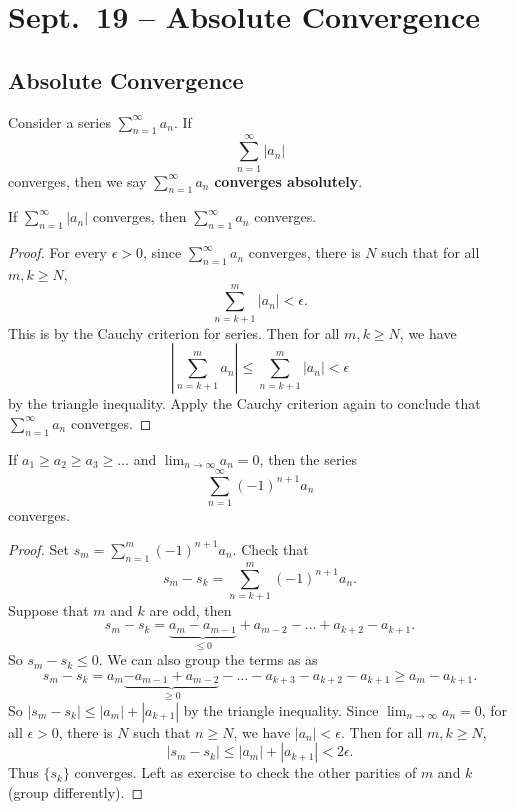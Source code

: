 \chapter{Sept.~19 -- Absolute Convergence}

\section{Absolute Convergence}

\begin{definition}
  Consider a series $\sum_{n=1}^\infty a_n$. If
  \[\sum_{n=1}^\infty |a_n|\]
  converges, then we say
  $\sum_{n=1}^\infty a_n$ \textbf{converges absolutely}.
\end{definition}

\begin{theorem}
  If $\sum_{n=1}^\infty |a_n|$ converges,
  then $\sum_{n = 1}^\infty a_n$ converges.
\end{theorem}

\begin{proof}
  For every $\epsilon > 0$, since $\sum_{n=1}^\infty a_n$
  converges, there is $N$ such that for all
  $m, k \ge N$,
  \[\sum_{n=k + 1}^m |a_n| < \epsilon.\]
  This is by the Cauchy criterion for series.
  Then for all $m, k \ge N$, we have
  \[
    \left\lvert \sum_{n=k+1}^m a_n\right\rvert
    \le \sum_{n=k+1}^m |a_n|
    < \epsilon
  \]
  by the triangle inequality. Apply
  the Cauchy criterion again to conclude that
  $\sum_{n=1}^\infty a_n$ converges.
\end{proof}

\begin{theorem}
  If $a_1 \ge a_2 \ge a_3 \ge \dots$ and
  $\lim_{n \to \infty} a_n = 0$, then
  the series
  \[
    \sum_{n = 1}^\infty (-1)^{n + 1} a_n
  \]
  converges.
\end{theorem}

\begin{proof}
  Set $s_m = \sum_{n=1}^m (-1)^{n+1} a_n$. Check
  that
  \[s_m - s_k = \sum_{n=k+1}^m (-1)^{n+1} a_n.\]
  Suppose that $m$ and $k$ are odd, then
  \[
    s_m - s_k = \underbrace{a_m - a_{m - 1}}_{\le 0} + a_{m-2} -
    \dots + a_{k + 2} - a_{k + 1}
  .\]
  So $s_m - s_k \le 0$.
  We can also group the terms as as
  \[
    s_m - s_k = a_m \underbrace{- a_{m - 1} + a_{m - 2}}_{\ge 0} -
    \dots - a_{k + 3} - a_{k + 2} - a_{k + 1}
    \ge a_{m} - a_{k + 1}
  .\]
  So $|s_m - s_k| \le |a_m| + |a_{k + 1}|$ by the
  triangle inequality.
  Since $\lim_{n \to \infty} a_n = 0$, for all
  $\epsilon > 0$, there is $N$ such that $n \ge N$,
  we have $|a_n| < \epsilon$. Then for all $m, k \ge N$,
  \[
    |s_m - s_k| \le |a_m| + |a_{k + 1}| < 2\epsilon
  .\]
  Thus $\{s_k\}$ converges.
  Left as exercise to check the other parities of
  $m$ and $k$ (group differently).
\end{proof}

